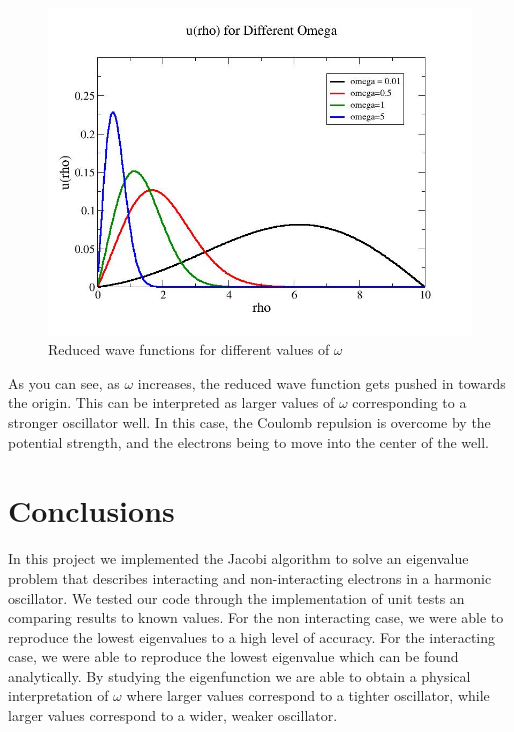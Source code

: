 \documentclass[%
oneside,                 %
final,                   %
10pt]{article}
\begin{document}
\begin{figure}[H]\label{fig:compzoom}
  \centering
    \includegraphics[width=1.2\textwidth]{wavefuntions.jpg}
    \caption{Reduced wave functions for different values of $\omega$}
\end{figure}

As you can see, as $\omega$ increases, the reduced wave function gets pushed in towards the origin.  This can be interpreted as larger values of $\omega$ corresponding to a stronger oscillator well.  In this case, the Coulomb repulsion is overcome by the potential strength, and the electrons being to move into the center of the well.

\section{Conclusions}

In this project we implemented the Jacobi algorithm to solve an eigenvalue problem that describes interacting and non-interacting electrons in a harmonic oscillator.  We tested our code through the implementation of unit tests an comparing results to known values.  For the non interacting case, we were able to reproduce the lowest eigenvalues to a high level of accuracy.  For the interacting case, we were able to reproduce the lowest eigenvalue which can be found analytically.  By studying the eigenfunction we are able to obtain a physical interpretation of $\omega$ where larger values correspond to a tighter oscillator, while larger values correspond to a wider, weaker oscillator.
\end{document}
